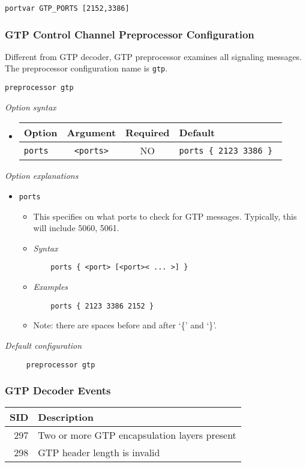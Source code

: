 \documentclass[english]{report}
\begin{document}
\begin{verbatim}
portvar GTP_PORTS [2152,3386]
\end{verbatim}

\subsubsection{GTP Control Channel Preprocessor Configuration}

Different from GTP decoder, GTP preprocessor examines all signaling messages.
The preprocessor configuration name is \texttt{gtp}.
\begin{verbatim}
preprocessor gtp
\end{verbatim}
\textit{Option syntax}
\begin{itemize}
\item[]
\begin{tabular}{|l|c|c|p{6cm}|}
\hline
Option & Argument & Required & Default\\
\hline
\hline
\texttt{ports} & \texttt{<ports>} & NO & \texttt{ports \{ 2123 3386 \} }\\
\hline
\end{tabular}
\end{itemize}
\normalsize
\textit{Option explanations}
\begin{itemize}
\item[] \texttt{ports}
\begin{itemize}
\item[]  This specifies on what ports to check for GTP messages. Typically, 
     this will include 5060, 5061.
\item[] \textit{Syntax}
\begin{verbatim}
    ports { <port> [<port>< ... >] }
\end{verbatim}
\item[] \textit{Examples}
\begin{verbatim}
    ports { 2123 3386 2152 }
\end{verbatim}
\item[] Note: there are spaces before and after `\{' and `\}'.
\end{itemize}
\end{itemize}
\normalsize

\textit{Default configuration}
\footnotesize
\begin{verbatim}
     preprocessor gtp
\end{verbatim}
\normalsize
\subsubsection{GTP Decoder Events}
\begin{longtable}{|r|p{13.5cm}|}
\hline
SID & Description\\
\hline
 297 &  Two or more GTP encapsulation layers present \\
\hline
 298 &  GTP header length is invalid  \\
\hline
\end{longtable}
\end{document}
